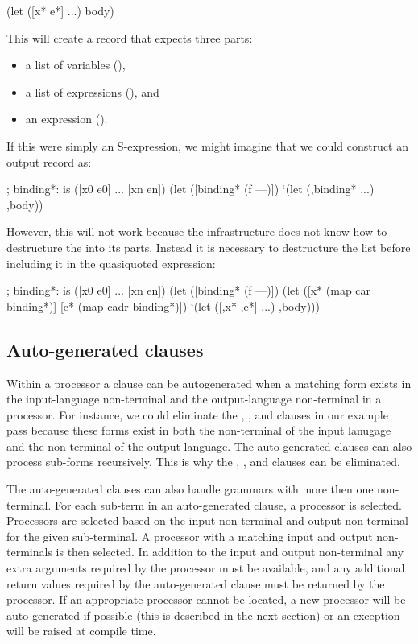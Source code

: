 \documentclass[letterpaper,10pt]{article}
\begin{document}
\begin{schemedisplay}
(let ([x* e*] ...) body)
\end{schemedisplay}

This will create a record that expects three parts:
\begin{itemize}
\item a list of variables (),
\item a list of expressions (), and
\item an expression ().
\end{itemize}

If this were simply an S-expression, we might imagine that we could construct
an output record as:

\begin{schemedisplay}
; binding*: is ([x0 e0] ... [xn en])
(let ([binding* (f ---)])
  `(let (,binding* ...) ,body))
\end{schemedisplay}

However, this will not work because the infrastructure does not know how to
destructure the  into its parts.
Instead it is necessary to destructure the  list before
including it in the quasiquoted expression:

\begin{schemedisplay}
; binding*: is ([x0 e0] ... [xn en])
(let ([binding* (f ---)])
  (let ([x* (map car binding*)]
        [e* (map cadr binding*)])
    `(let ([,x* ,e*] ...) ,body)))
\end{schemedisplay}

\subsection{Auto-generated clauses}

Within a processor a clause can be autogenerated when a matching form exists in
the input-language non-terminal and the output-language non-terminal in a
processor.
For instance, we could eliminate the , , and
 clauses in our example pass because these forms exist in
both the  non-terminal of the input lanugage and the 
non-terminal of the output language.
The auto-generated clauses can also process sub-forms recursively.
This is why the , , and
 clauses can be eliminated.

The auto-generated clauses can also handle grammars with more then one
non-terminal.
For each sub-term in an auto-generated clause, a processor is selected.
Processors are selected based on the input non-terminal and output non-terminal
for the given sub-terminal.
A processor with a matching input and output non-terminals is then selected.
In addition to the input and output non-terminal any extra arguments required
by the processor must be available, and any additional return values required
by the auto-generated clause must be returned by the processor.
If an appropriate processor cannot be located, a new processor will be
auto-generated if possible (this is described in the next section) or an
exception will be raised at compile time.
\end{document}
